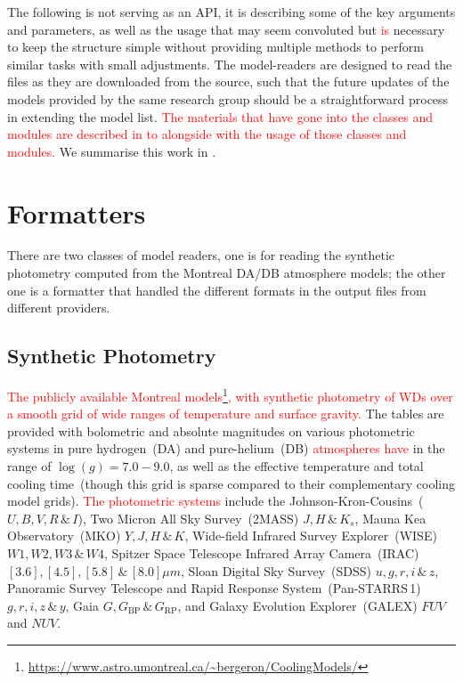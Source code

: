 \documentclass[fleqn,usenatbib]{rasti}
\begin{document}
The following is not serving as an API, it is describing some of the key
arguments and parameters, as well as the usage that may seem convoluted but
\textcolor{red}{is} necessary to keep the structure simple without providing
multiple methods to perform similar tasks with small adjustments. The
model-readers are designed to read the files as they are downloaded from the
source, such that the future updates of the models provided by the same research
group should be a straightforward process in extending the model list.
\textcolor{red}{The materials that have gone into the classes and modules are
described in  to  alongside with the usage of those
classes and modules.} We summarise this work in .

\section{Formatters}
There are two classes of model readers, one is for reading the synthetic
photometry computed from the Montreal DA/DB atmosphere models; the other one is
a formatter that handled the different formats in the output files from
different providers.

\subsection*{Synthetic Photometry}
\textcolor{red}{The publicly available Montreal models\footnote{\url{https://www.astro.umontreal.ca/~bergeron/CoolingModels/}},
with synthetic photometry of WDs over a smooth grid of wide ranges of temperature
and surface gravity.} The tables are provided with bolometric and absolute
magnitudes on various photometric systems in pure hydrogen~(DA) and pure-helium~(DB)
\textcolor{red}{atmospheres have} in the range of $\log(g)=7.0 - 9.0$, as well as
the effective temperature and total cooling time~(though this grid is sparse
compared to their complementary cooling model grids). \textcolor{red}{The
photometric systems} include the Johnson-Kron-Cousins~($U, B, V, R\,\&\,I$),
Two Micron All Sky Survey~(2MASS) $J, H\,\&\,K_{s}$, Mauna Kea Observatory~(MKO)
$Y, J, H\,\&\,K$, Wide-field Infrared Survey Explorer~(WISE) $W1, W2, W3\,\&\,W4$,
Spitzer Space Telescope Infrared Array Camera~(IRAC)
$[3.6], [4.5], [5.8]\,\&\,[8.0] \mu m$, Sloan Digital Sky Survey~(SDSS)
$u, g, r, i\,\&\,z$, Panoramic Survey Telescope and Rapid Response
System~(Pan-STARRS\,1) $g, r, i, z\,\&\,y$,
Gaia $G, G_{\mathrm{BP}}\,\&\,G_{\mathrm{RP}}$, and Galaxy Evolution
Explorer~(GALEX) $FUV$ and $NUV$.
\end{document}
